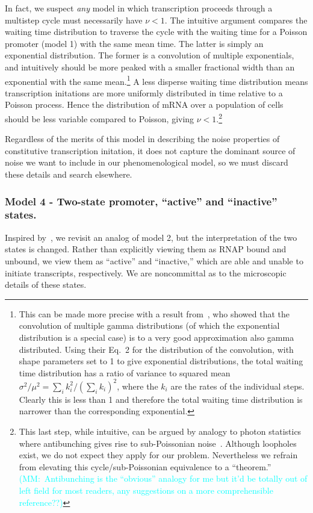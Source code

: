 \documentclass[12pt]{article}%
\newcommand{\mmnote}[1]{\textcolor{cyan}{(MM:~#1)}}
\begin{document}
In fact, we suspect \textit{any} model in which transcription
proceeds through a multistep cycle must necessarily have $\nu<1$.
The intuitive argument compares the waiting time distribution to
traverse the cycle with the waiting time for a Poisson promoter
(model 1) with the same mean time. The latter is simply an
exponential distribution. The former is a convolution of multiple
exponentials, and intuitively should be more peaked with a
smaller fractional width than an exponential with the same mean.\footnote{
This can be made more precise with a result
from~\cite{Stewart2007}, who showed that the convolution of
multiple gamma distributions (of which the exponential
distribution is a special case) is to a very good approximation
also gamma distributed. Using their Eq.~2 for the distribution of
the convolution, with shape parameters set to 1 to
give exponential distributions, the total waiting time
distribution has a ratio of variance to squared mean 
$\sigma^2/\mu^2 = \sum_i k_i^2/\left(\sum_i k_i\right)^2$,
where the $k_i$ are the rates of the individual steps. Clearly
this is less than 1 and therefore the total waiting time
distribution is narrower than the corresponding exponential.} A
less disperse waiting time distribution means transcription
initations are more uniformly distributed in time relative to a
Poisson process. Hence the distribution of mRNA over a population
of cells should be less variable compared to Poisson, giving
$\nu<1$.\footnote{
This last step, while intuitive, can be argued by analogy to
photon statistics where antibunching gives rise to sub-Poissonian
noise~\cite{Paul1982, Zou1990}. Although loopholes exist, we do
not expect they apply for our problem. Nevertheless we refrain
from elevating this cycle/sub-Poissonian equivalence to a ``theorem.''
\mmnote{Antibunching is the ``obvious'' analogy for me but it'd
be totally out of left field for most readers, any suggestions on
a more comprehensible reference??}
}

Regardless of the merits of this model in describing the noise
properties of constitutive transcription initation, it does not
capture the dominant source of noise we want to include in our
phenomenological model, so we must discard these details and
search elsewhere.

\subsubsection{Model 4 - Two-state promoter,
``active'' and ``inactive'' states.}
Inspired by~\cite{Razo-Mejia2020}, we revisit an analog of model
2, but the interpretation of the two states is changed. Rather
than explicitly viewing them as RNAP bound and unbound, we view
them as ``active'' and ``inactive,'' which are able and unable to
initiate transcripts, respectively. We are noncommittal as to the
microscopic details of these states.
\end{document}
